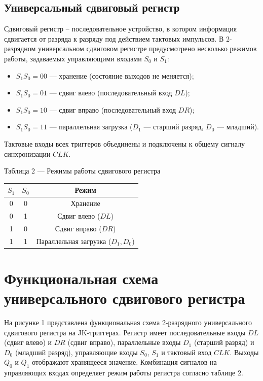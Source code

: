 \documentclass[oneside,a4paper,14pt]{extarticle}
\begin{document}
\subsection{Универсальный сдвиговый регистр}
Сдвиговый регистр -- последовательное устройство, в котором информация сдвигается от разряда к разряду под действием тактовых импульсов. В 2-разрядном универсальном сдвиговом регистре предусмотрено несколько режимов работы, задаваемых управляющими входами $S_0$ и $S_1$:
\begin{itemize}
  \item $S_1S_0 = 00$ --- хранение (состояние выходов не меняется);
  \item $S_1S_0 = 01$ --- сдвиг влево (последовательный вход $DL$);
  \item $S_1S_0 = 10$ --- сдвиг вправо (последовательный вход $DR$);
  \item $S_1S_0 = 11$ --- параллельная загрузка ($D_1$ --- старший разряд, $D_0$ --- младший).
\end{itemize}
Тактовые входы всех триггеров объединены и подключены к общему сигналу синхронизации $CLK$.

\begin{center}
  Таблица 2 --- Режимы работы сдвигового регистра \\
  \vspace{5mm}
  \begin{tabular}{|c|c|c|}
    \hline
    $S_1$ & $S_0$ & Режим \\
    \hline
    0 & 0 & Хранение \\
    0 & 1 & Сдвиг влево ($DL$) \\
    1 & 0 & Сдвиг вправо ($DR$) \\
    1 & 1 & Параллельная загрузка ($D_1, D_0$) \\
    \hline
  \end{tabular}
\end{center}

\section{Функциональная схема универсального сдвигового регистра}
На рисунке 1 представлена функциональная схема 2-разрядного универсального сдвигового регистра на JK-триггерах. Регистр имеет последовательные входы $DL$ (сдвиг влево) и $DR$ (сдвиг вправо), параллельные входы $D_1$ (старший разряд) и $D_0$ (младший разряд), управляющие входы $S_0$, $S_1$ и тактовый вход $CLK$. Выходы $Q_0$ и $Q_1$ отображают хранящееся значение. Комбинация сигналов на управляющих входах определяет режим работы регистра согласно таблице 2.
\end{document}
